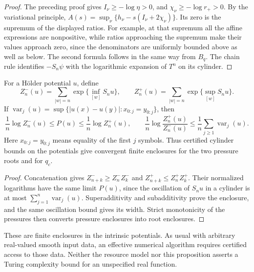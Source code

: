 \begin{proof}
The preceding proof gives $I_\nu\ge-\log\eta>0$, and
$\chi_\nu\ge-\log r_+>0$. By the variational principle,
$A(s)=\sup_\nu\{h_\nu-s(I_\nu+2\chi_\nu)\}$.
Its zero is the supremum of the displayed ratios. For example,
at that supremum all the affine expressions are nonpositive,
while ratios approaching the supremum make their values approach
zero, since the denominators are uniformly bounded above as well
as below. The second formula follows in the same way from $B_q$.
The chain rule identifies $-S_n\psi$ with the logarithmic
expansion of $T^n$ on its cylinder.
\end{proof}

\begin{proposition}\label{prop:v5-enclosures}
For a H\"older potential $u$, define
\[
 Z_n^-(u)=\sum_{|w|=n}\exp\{\inf_{[w]}S_nu\},\qquad
 Z_n^+(u)=\sum_{|w|=n}\exp\{\sup_{[w]}S_nu\}.
\]
If $\operatorname{var}_j(u)=\sup\{|u(x)-u(y)|:x_{0:j}=y_{0:j}\}$,
then
\begin{equation}\label{eq:v5-enclosures}
 \frac1n\log Z_n^-(u)\le P(u)\le\frac1n\log Z_n^+(u),\qquad
 \frac1n\log\frac{Z_n^+(u)}{Z_n^-(u)}
 \le\frac1n\sum_{j\ge1}\operatorname{var}_j(u).
\end{equation}
Here $x_{0:j}=y_{0:j}$ means equality of the first $j$ symbols.
Thus certified cylinder bounds on the potentials give convergent
finite enclosures for the two pressure roots and for $q_c$.
\end{proposition}

\begin{proof}
Concatenation gives $Z_{n+k}^-\ge Z_n^-Z_k^-$ and
$Z_{n+k}^+\le Z_n^+Z_k^+$. Their normalized logarithms have the
same limit $P(u)$, since the oscillation of $S_nu$ in a cylinder
is at most $\sum_{j=1}^n\operatorname{var}_j(u)$. Superadditivity
and subadditivity prove the enclosure, and the same oscillation
bound gives its width. Strict monotonicity of the pressures
then converts pressure enclosures into root enclosures.
\end{proof}

These are finite enclosures in the intrinsic potentials. As usual
with arbitrary real-valued smooth input data, an effective numerical
algorithm requires certified access to those data. Neither the
resource model nor this proposition asserts a Turing complexity
bound for an unspecified real function.

